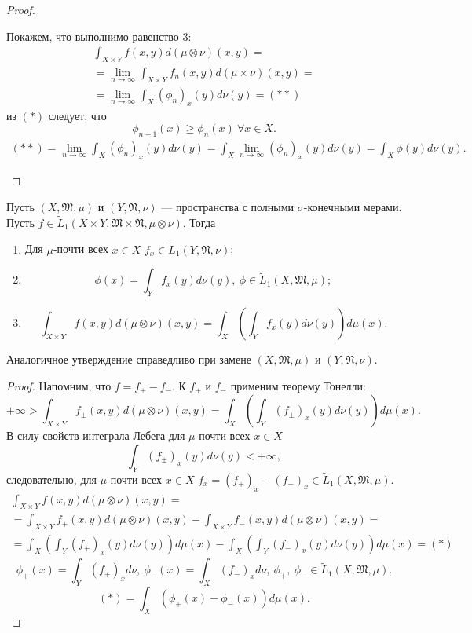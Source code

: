 \begin{proof}
\begin{enumerate}
    Покажем, что выполнимо равенство 3:
    \begin{multline*}
    \int_{X \times Y} f(x,y) d(\mu \otimes \nu)(x,y)
    =\\=
    \lim\limits_{n\to \infty} \int_{X \times Y} f_n(x,y) d(\mu \times \nu)(x,y)
    =\\=
    \lim\limits_{n\to \infty} \int_X (\phi_n)_x(y) d\nu(y) =(**)
    \end{multline*} 
    из $(*)$ следует, что
    \[\phi_{n+1}(x) \geqslant \phi_n(x) \ \forall x \in \underline{X}.\]
    \begin{multline*}
        (**) = \lim\limits_{n\to \infty} \int_{\underline{X}} (\phi_n)_x (y) d\nu(y)
        =
        \int_{\underline{X}} \lim\limits_{n\to \infty} (\phi_n)_x (y) d\nu(y)
        =
        \int_X \phi(y) d\nu(y).
    \end{multline*} 
\end{enumerate}
\end{proof} 

\begin{theorem}[Фубини]
    Пусть $(X, \mathfrak{M}, \mu)$ и $(Y, \mathfrak{N}, \nu)$ — пространства с полными $\sigma$-конечными мерами.
    Пусть $f \in \widetilde{L}_1(X \times Y, \mathfrak{M} \times \mathfrak{N}, \mu \otimes \nu)$. Тогда
    \begin{enumerate}
        \item Для $\mu$-почти всех $x \in X$ $f_x \in \widetilde{L}_1(Y, \mathfrak{N}, \nu)$;
        \item \[\phi(x) = \int_Y f_x(y) d\nu(y), \ \phi \in \widetilde{L}_1(X, \mathfrak{M}, \mu);\]
        \item \[\int_{X \times Y} f(x,y) d(\mu \otimes \nu)(x,y) = \int_X \left(\int_Y f_x(y) d\nu(y)\right)d\mu(x).\]
    \end{enumerate}
    Аналогичное утверждение справедливо при замене $(X, \mathfrak{M}, \mu)$ и $(Y, \mathfrak{N}, \nu)$.
\end{theorem} 
\begin{proof}
    Напомним, что $f = f_+ - f_-$.
    К $f_+$ и $f_-$ применим теорему Тонелли:
    \[+\infty > \int_{X \times Y} f_{\pm}(x,y)d(\mu \otimes \nu)(x,y) = \int_X \left(\int_Y (f_{\pm})_x (y) d\nu(y)\right)d\mu(x).\]
    В силу свойств интеграла Лебега для $\mu$-почти всех $x \in X$
    \[\int_Y (f_{\pm})_x(y)d\nu(y) < +\infty,\]
    следовательно, для $\mu$-почти всех $x \in X$ $f_x = (f_+)_x - (f_-)_x \in \widetilde{L}_1(X, \mathfrak{M}, \mu)$.
    \begin{multline*}
        \int_{X \times Y} f(x,y) d(\mu \otimes \nu)(x,y)
        =\\=
        \int_{X \times Y} f_+(x,y)d(\mu \otimes \nu)(x,y) - \int_{X \times Y} f_-(x,y) d(\mu \otimes \nu)(x,y)
        =\\=
        \int_X \left(\int_Y (f_+)_x(y)d\nu(y)\right)d\mu(x) - \int_X \left(\int_Y (f_-)_x(y)d\nu(y)\right)d\mu(x) = (*)
    \end{multline*} 
    \[\phi_+(x) = \int_Y (f_+)_x d\nu, \ \phi_-(x) = \int_X (f_-)_x d\nu, \ \phi_+, \ \phi_- \in \widetilde{L}_1(X, \mathfrak{M}, \mu).\]
    \[(*) = \int_X (\phi_+(x) - \phi_-(x)) d\mu(x).\]
\end{proof} 

